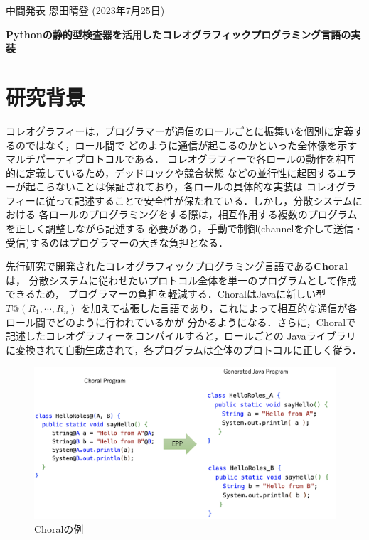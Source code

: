 \documentclass[11pt]{jarticle}
\begin{document}
%
\begin{flushleft}
  中間発表\hspace{\fill}
  恩田晴登 (2023年7月25日)
\end{flushleft}
\begin{center}
{\Large\bf Pythonの静的型検査器を活用したコレオグラフィックプログラミング言語の実装}
\end{center}

\section{研究背景}
コレオグラフィー\cite{choreography}は，プログラマーが通信のロールごとに振舞いを個別に定義するのではなく，ロール間で
どのように通信が起こるのかといった全体像を示すマルチパーティプロトコルである．
コレオグラフィーで各ロールの動作を相互的に定義しているため，デッドロックや競合状態
などの並行性に起因するエラーが起こらないことは保証されており，各ロールの具体的な実装は
コレオグラフィーに従って記述することで安全性が保たれている．しかし，分散システムにおける
各ロールのプログラミングをする際は，相互作用する複数のプログラムを正しく調整しながら記述する
必要があり，手動で制御(channelを介して送信・受信)するのはプログラマーの大きな負担となる．

先行研究で開発されたコレオグラフィックプログラミング言語である{\bf{Choral}}\cite{choral}は，
分散システムに従わせたいプロトコル全体を単一のプログラムとして作成できるため，
プログラマーの負担を軽減する．ChoralはJavaに新しい型{\bf{$T@(R_1,\cdots,R_n)$}}
を加えて拡張した言語であり，これによって相互的な通信が各ロール間でどのように行われているかが
分かるようになる．さらに，Choralで記述したコレオグラフィーをコンパイルすると，ロールごとの
Javaライブラリに変換されて自動生成されて，各プログラムは全体のプロトコルに正しく従う．
\begin{figure}[htbp]
  \begin{center}
  \includegraphics[width=130mm]{choral_ex.png}
  \caption{Choralの例}
  \end{center}
\end{figure}
\end{document}
